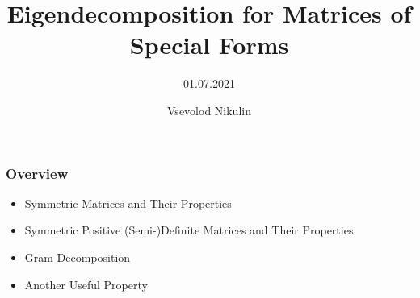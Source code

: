 \documentclass[8pt]{beamer}
\title[Short title]{\color{black} Eigendecomposition for Matrices of Special Forms}
\subtitle{ \color{black}
01.07.2021
}
\author{Vsevolod Nikulin} %
\date{} %
\begin{document}

\begin{frame}[plain]
\vspace*{1.55cm} %
\titlepage %
\end{frame}


\begin{frame}
\frametitle{Overview} %

\begin{itemize}
    \item Symmetric Matrices and Their Properties
    \item Symmetric Positive (Semi-)Definite Matrices and Their Properties
    \item Gram Decomposition
    \item Another Useful Property
\end{itemize}

\end{frame}
\end{document}
